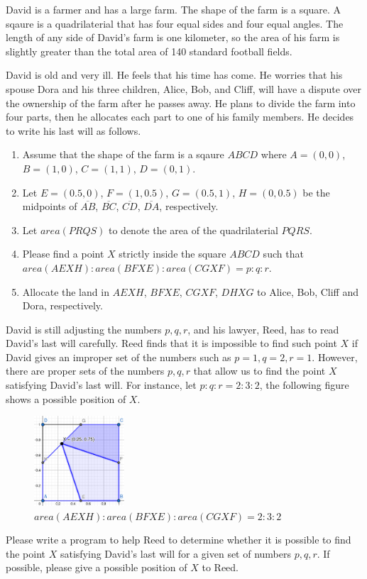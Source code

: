 David is a farmer and has a large farm. The shape of the farm is a square.
A sqaure is a quadrilaterial that has four equal sides and four equal angles.
The length of any side of David's farm is one kilometer, so the area of his farm
is slightly greater than the total area of 140 standard football fields.

David is old and very ill. He feels that his time has come.
He worries that his spouse Dora and his three children, Alice, Bob, and Cliff, 
will have a dispute over the ownership
of the farm after he passes away.
He plans to divide the farm into four parts, 
then he allocates each part to one of his family members.
He decides to write his last will as follows.
\begin{enumerate}
\tightlist
\item Assume that the shape of the farm is a sqaure $ABCD$ where $A=(0,0)$, $B=(1,0)$, 
$C=(1,1)$, $D=(0,1)$. 
\item Let $E=(0.5,0)$, $F=(1,0.5)$, $G=(0.5,1)$, $H=(0,0.5)$ be the midpoints of 
$\overline{AB}$, $\overline{BC}$, $\overline{CD}$, $\overline{DA}$, respectively.
\item Let $area(PRQS)$ to denote the area of the quadrilaterial $PQRS$.
\item Please find a point $X$ strictly inside the square $ABCD$ such that 
$area(AEXH):area(BFXE):area(CGXF) = p:q:r$.
\item Allocate the land in $AEXH$, $BFXE$, $CGXF$, $DHXG$ to Alice, Bob, Cliff and Dora,
respectively.
\end{enumerate}

David is still adjusting the numbers $p,q,r$, and his lawyer, Reed, has to read David's
last will carefully. Reed finds that it is impossible to find such point $X$ if 
David gives an improper set of the numbers such as $p=1, q=2, r=1$. 
However, there are proper sets of the numbers $p,q,r$ that allow us to find the point $X$
satisfying David's last will.
For instance, let $p:q:r = 2:3:2$, the following figure shows a possible position of $X$.

\begin{figure}[h]
\center
\includegraphics[width=0.3\textwidth]{image/farm.png}
\caption{$area(AEXH):area(BFXE):area(CGXF) = 2:3:2$}
\end{figure}

Please write a program to help Reed to determine whether it is possible to find the point
$X$ satisfying David's last will for a given set of numbers $p,q,r$.
If possible, please give a possible position of $X$ to Reed.
